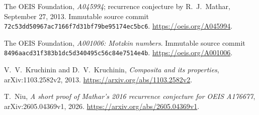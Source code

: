 The OEIS Foundation, \emph{A045994}; recurrence conjecture by
R.~J.~Mathar, September 27, 2013.
Immutable source commit
\texttt{72c53dd50967ac7166f7d31bf79be95174ec5bc6}.
\url{https://oeis.org/A045994}.

The OEIS Foundation, \emph{A001006: Motzkin numbers}.
Immutable source commit
\texttt{8496aacd31f383b1dc5d340495c56c84e7514e4b}.
\url{https://oeis.org/A001006}.

V.~V.~Kruchinin and D.~V.~Kruchinin,
\emph{Composita and its properties}, arXiv:1103.2582v2, 2013.
\url{https://arxiv.org/abs/1103.2582v2}.

T.~Niu, \emph{A short proof of Mathar's 2016 recurrence conjecture
for OEIS A176677}, arXiv:2605.04369v1, 2026.
\url{https://arxiv.org/abs/2605.04369v1}.
